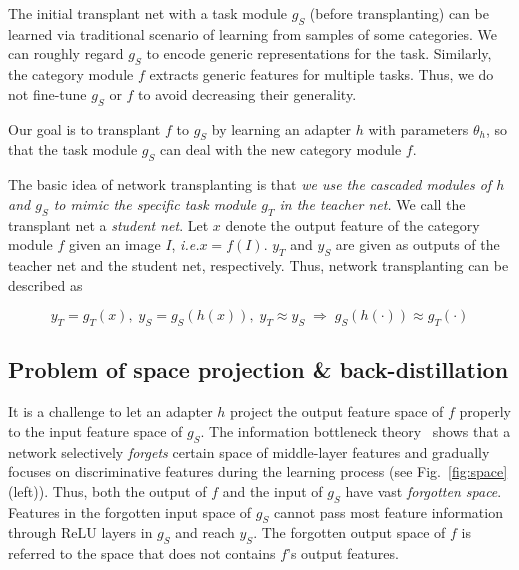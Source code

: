 \documentclass[10pt,twocolumn,letterpaper]{article}
\begin{document}
The initial transplant net with a task module {\small$g_{S}$} (before transplanting) can be learned via traditional scenario of learning from samples of some categories. We can roughly regard {\small$g_{S}$} to encode generic representations for the task. Similarly, the category module $f$ extracts generic features for multiple tasks. Thus, we do not fine-tune {\small$g_{S}$} or $f$ to avoid decreasing their generality.

Our goal is to transplant $f$ to {\small$g_{S}$} by learning an adapter $h$ with parameters $\theta_{h}$, so that the task module {\small$g_{S}$} can deal with the new category module $f$.

The basic idea of network transplanting is that \textit{we use the cascaded modules of $h$ and {\small$g_{S}$} to mimic the specific task module {\small$g_{T}$} in the teacher net.} We call the transplant net a \textit{student net}. Let $x$ denote the output feature of the category module $f$ given an image $I$, \emph{i.e.}{\small$x=f(I)$}. {\small$y_{T}$} and {\small$y_{S}$} are given as outputs of the teacher net and the student net, respectively. Thus, network transplanting can be described as
\begin{small}
\begin{equation}
\!y_{T}\!=\!g_{T}(x),\; y_{S}\!=\!g_{S}(h(x)), \; y_{T}\!\approx\!y_{S} \;\Rightarrow\; g_{S}(h(\cdot))\!\approx\!g_{T}(\cdot)\!\!\!
\end{equation}
\end{small}


\subsection{Problem of space projection \& back-distillation}
\label{sec:challenge}

It is a challenge to let an adapter $h$ project the output feature space of $f$ properly to the input feature space of {\small$g_{S}$}. The information bottleneck theory~\cite{InformationBottleneck,InformationBottleneck2} shows that a network selectively \textit{forgets} certain space of middle-layer features and gradually focuses on discriminative features during the learning process (see Fig.~\ref{fig:space}(left)). Thus, both the output of $f$ and the input of {\small$g_{S}$} have vast \textit{forgotten space}. Features in the forgotten input space of {\small$g_{S}$} cannot pass most feature information through ReLU layers in {\small$g_{S}$} and reach {\small$y_{S}$}. The forgotten output space of $f$ is referred to the space that does not contains $f$'s output features.
\end{document}
